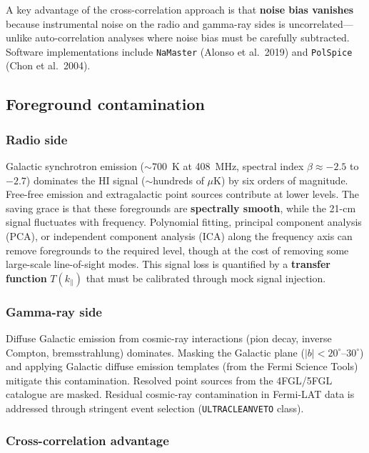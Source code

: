 \documentclass[10pt,a4paper]{article}
\begin{document}
A key advantage of the cross-correlation approach is that \textbf{noise bias vanishes} because instrumental noise on the radio and gamma-ray sides is uncorrelated---unlike auto-correlation analyses where noise bias must be carefully subtracted. Software implementations include \texttt{NaMaster} (Alonso et al.\ 2019) and \texttt{PolSpice} (Chon et al.\ 2004).

\subsection{Foreground contamination}

\subsubsection{Radio side}

Galactic synchrotron emission ($\sim 700$~K at 408~MHz, spectral index $\beta \approx -2.5$ to $-2.7$) dominates the HI signal ($\sim$hundreds of $\mu$K) by six orders of magnitude. Free-free emission and extragalactic point sources contribute at lower levels. The saving grace is that these foregrounds are \textbf{spectrally smooth}, while the 21-cm signal fluctuates with frequency. Polynomial fitting, principal component analysis (PCA), or independent component analysis (ICA) along the frequency axis can remove foregrounds to the required level, though at the cost of removing some large-scale line-of-sight modes. This signal loss is quantified by a \textbf{transfer function} $T(k_\parallel)$ that must be calibrated through mock signal injection.

\subsubsection{Gamma-ray side}

Diffuse Galactic emission from cosmic-ray interactions (pion decay, inverse Compton, bremsstrahlung) dominates. Masking the Galactic plane ($|b| < 20^\circ$--$30^\circ$) and applying Galactic diffuse emission templates (from the Fermi Science Tools) mitigate this contamination. Resolved point sources from the 4FGL/5FGL catalogue are masked. Residual cosmic-ray contamination in Fermi-LAT data is addressed through stringent event selection (\texttt{ULTRACLEANVETO} class).

\subsubsection{Cross-correlation advantage}
\end{document}
